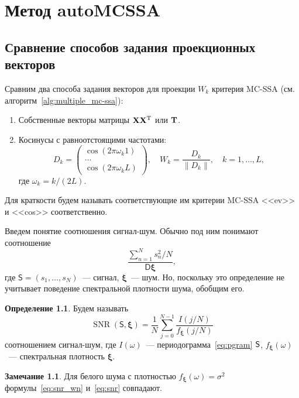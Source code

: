 \documentclass[specialist,
substylefile = spbu_report.rtx,
subf,href,colorlinks=true, 12pt]{disser}
\theoremstyle{definition}
\newtheorem{definition}{Определение}[chapter]
\newtheorem{remark}{Замечание}[chapter]
\begin{document}
\chapter{Метод autoMCSSA}

\section{Сравнение способов задания проекционных векторов}

Сравним два способа задания векторов для проекции $W_k$ критерия MC-SSA (см. алгоритм~\ref{alg:multiple_mc-ssa}):
\begin{enumerate}
	\item Собственные векторы матрицы $\mathbf{X}\mathbf{X}^{\mathrm{T}}$ или $\mathbf{T}$.
	\item Косинусы с равноотстоящими частотами:
	\[
	D_k=
	\begin{pmatrix}
		\cos(2\pi\omega_k 1) \\
		\ldots \\
		\cos(2\pi\omega_k L)	
	\end{pmatrix},\quad W_k=\frac{D_k}{\|D_k\|},\quad k=1,\ldots,L,
	\]
	где $\omega_k=k / (2L)$.
\end{enumerate}
Для краткости будем называть соответствующие им критерии MC-SSA <<ev>> и <<cos>> соответственно.

Введем понятие соотношения сигнал-шум. Обычно под ним понимают соотношение
\begin{equation}
	\frac{\sum\limits_{n=1}^N s^2_n/N}{\mathsf{D}{\bm\xi}},
\end{equation}\label{eq:snr_wn}
где $\mathsf{S}=(s_1,\ldots,s_N)$~--- сигнал, $\bm{\xi}$~--- шум. Но, поскольку это определение не учитывает поведение спектральной плотности шума, обобщим его.

\begin{definition}
	Будем называть
	\begin{equation}\label{eq:snr}
		\operatorname{SNR}(\mathsf{S}, \bm\xi)=\frac1N\sum_{j=0}^{N-1}\frac{I(j/N)}{f_{\bm{\xi}}(j/N)}
	\end{equation}
	соотношением сигнал-шум, где $I(\omega)$~--- периодограмма~\eqref{eq:pgram} $\mathsf{S}$, $f_{\bm\xi}(\omega)$~--- спектральная плотность $\bm\xi$.
\end{definition}

\begin{remark}
	Для белого шума с плотностью $f_{\bm\xi}(\omega)=\sigma^2$ формулы~\eqref{eq:snr_wn} и~\eqref{eq:snr} совпадают.
\end{remark}
\end{document}
